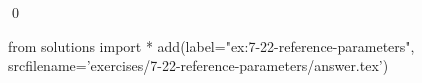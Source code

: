 
\begin{ex}
  \label{ex:7-22-reference-parameters}
  
  \qed
\end{ex}
\begin{python0}
from solutions import *
add(label="ex:7-22-reference-parameters",
    srcfilename='exercises/7-22-reference-parameters/answer.tex')
\end{python0}
